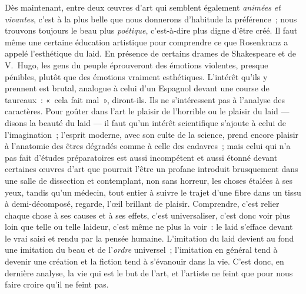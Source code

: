 \documentclass[french,twoside]{book} %
\begin{document}
Dès maintenant, entre deux œuvres d’art qui semblent également \emph{animées et vivantes}, c’est à la plus belle que nous donnerons d’habitude la préférence ; nous trouvons toujours le beau plus \emph{poétique}, c’est-à-dire plus digne d’être créé. Il faut même une certaine éducation artistique pour comprendre ce que Rosenkranz a appelé l’esthétique du laid. En présence de certains drames de Shakespeare et de  V. Hugo, les gens du peuple éprouveront des émotions violentes, presque pénibles, plutôt que des émotions vraiment esthétiques. L’intérêt qu’ils y prennent est brutal, analogue à celui d’un Espagnol devant une course de taureaux : « cela fait mal », diront-ils. Ils ne s’intéressent pas à l’analyse des caractères. Pour goûter dans l’art le plaisir de l’horrible ou le plaisir du laid — disons la beauté du laid — il faut qu’un intérêt scientifique s’ajoute à celui de l’imagination ; l’esprit moderne, avec son culte de la science, prend encore plaisir à l’anatomie des êtres dégradés comme à celle des cadavres ; mais celui qui n’a pas fait d’études préparatoires est aussi incompétent et aussi étonné devant certaines œuvres d’art que pourrait l’être un profane introduit brusquement dans une salle de dissection et contemplant, non sans horreur, les choses étalées à ses yeux, tandis qu’un médecin, tout entier à suivre le trajet d’une fibre dans un tissu à demi-décomposé, regarde, l’œil brillant de plaisir. Comprendre, c’est relier chaque chose à ses causes et à ses effets, c’est universaliser, c’est donc voir plus loin que telle ou telle laideur, c’est même ne plus la voir : le laid s’efface devant le vrai saisi et rendu par la pensée humaine. L’imitation du laid devient au fond une imitation du beau et de l’\emph{ordre} universel ; l’imitation en général tend à devenir une création et la fiction tend à s’évanouir dans la vie. C’est donc, en dernière analyse, la vie qui est le but de l’art, et l’artiste ne feint que pour nous faire croire qu’il ne feint pas.
\end{document}
